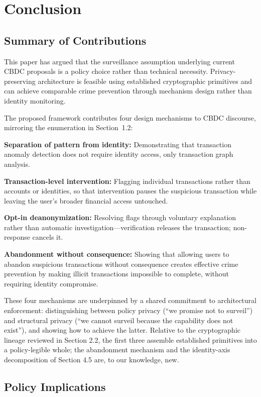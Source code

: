 \documentclass[11pt]{article}
\begin{document}
\section{Conclusion}

\subsection{Summary of Contributions}

This paper has argued that the surveillance assumption underlying current CBDC proposals is a policy choice rather than technical necessity. Privacy-preserving architecture is feasible using established cryptographic primitives and can achieve comparable crime prevention through mechanism design rather than identity monitoring.

The proposed framework contributes four design mechanisms to CBDC discourse, mirroring the enumeration in Section~1.2:

\textbf{Separation of pattern from identity:} Demonstrating that transaction anomaly detection does not require identity access, only transaction graph analysis.

\textbf{Transaction-level intervention:} Flagging individual transactions rather than accounts or identities, so that intervention pauses the suspicious transaction while leaving the user's broader financial access untouched.

\textbf{Opt-in deanonymization:} Resolving flags through voluntary explanation rather than automatic investigation---verification releases the transaction; non-response cancels it.

\textbf{Abandonment without consequence:} Showing that allowing users to abandon suspicious transactions without consequence creates effective crime prevention by making illicit transactions impossible to complete, without requiring identity compromise.

These four mechanisms are underpinned by a shared commitment to architectural enforcement: distinguishing between policy privacy (``we promise not to surveil'') and structural privacy (``we cannot surveil because the capability does not exist''), and showing how to achieve the latter. Relative to the cryptographic lineage reviewed in Section 2.2, the first three assemble established primitives into a policy-legible whole; the abandonment mechanism and the identity-axis decomposition of Section 4.5 are, to our knowledge, new.

\subsection{Policy Implications}
\end{document}
